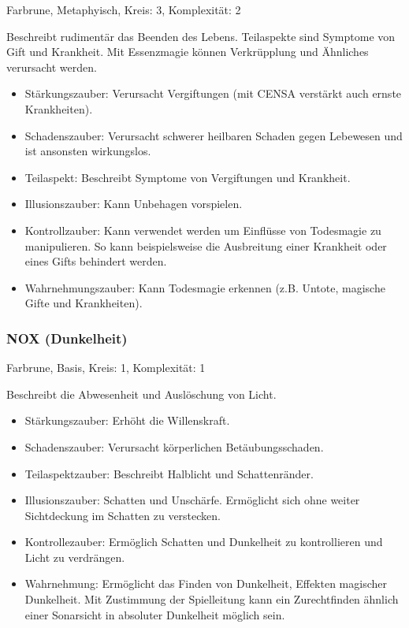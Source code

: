 \documentclass{article}
\begin{document}
Farbrune, Metaphyisch, Kreis: 3, Komplexität: 2

Beschreibt rudimentär das Beenden des Lebens. Teilaspekte sind Symptome von Gift und Krankheit. Mit Essenzmagie
können Verkrüpplung und Ähnliches verursacht werden.

\begin{itemize}
\item Stärkungszauber: Verursacht Vergiftungen (mit CENSA verstärkt auch ernste Krankheiten).
\item Schadenszauber: Verursacht schwerer heilbaren Schaden gegen Lebewesen und ist ansonsten wirkungslos.
\item Teilaspekt: Beschreibt Symptome von Vergiftungen und Krankheit.
\item Illusionszauber: Kann Unbehagen vorspielen.
\item Kontrollzauber: Kann verwendet werden um Einflüsse von Todesmagie zu manipulieren. So kann beispielsweise die  Ausbreitung einer Krankheit oder eines Gifts behindert werden.
\item Wahrnehmungszauber: Kann Todesmagie erkennen (z.B. Untote, magische Gifte und Krankheiten).
\end{itemize}

\subsubsection{NOX (Dunkelheit)}

Farbrune, Basis, Kreis: 1, Komplexität: 1

Beschreibt die Abwesenheit und Auslöschung von Licht.

\begin{itemize}
\item Stärkungszauber: Erhöht die Willenskraft.
\item Schadenszauber: Verursacht körperlichen Betäubungsschaden.
\item Teilaspektzauber: Beschreibt Halblicht und Schattenränder.
\item Illusionszauber: Schatten und Unschärfe. Ermöglicht sich ohne weiter Sichtdeckung im Schatten zu verstecken.
\item Kontrollezauber: Ermöglich Schatten und Dunkelheit zu kontrollieren und Licht zu verdrängen.
\item Wahrnehmung: Ermöglicht das Finden von Dunkelheit, Effekten magischer Dunkelheit. Mit Zustimmung der Spielleitung kann ein Zurechtfinden ähnlich einer Sonarsicht in absoluter Dunkelheit möglich sein.
\end{itemize}
\end{document}
